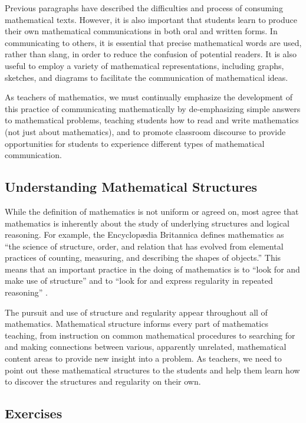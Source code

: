 \documentclass[
]{book}
\theoremstyle{definition}
\theoremstyle{definition}
\theoremstyle{definition}
\theoremstyle{remark}
\begin{document}
Previous paragraphs have described the difficulties and process of consuming mathematical texts. However, it is also important that students learn to produce their own mathematical communications in both oral and written forms. In communicating to others, it is essential that precise mathematical words are used, rather than slang, in order to reduce the confusion of potential readers. It is also useful to employ a variety of mathematical representations, including graphs, sketches, and diagrams to facilitate the communication of mathematical ideas.

As teachers of mathematics, we must continually emphasize the development of this practice of communicating mathematically by de-emphasizing simple answers to mathematical problems, teaching students how to read and write mathematics (not just about mathematics), and to promote classroom discourse to provide opportunities for students to experience different types of mathematical communication.

\hypertarget{understanding-mathematical-structures}{%
\subsection{Understanding Mathematical Structures}\label{understanding-mathematical-structures}}

While the definition of mathematics is not uniform or agreed on, most agree that mathematics is inherently about the study of underlying structures and logical reasoning. For example, the Encyclopædia Britannica \citeyearpar{definition} defines mathematics as ``the science of structure, order, and relation that has evolved from elemental practices of counting, measuring, and describing the shapes of objects.'' This means that an important practice in the doing of mathematics is to ``look for and make use of structure'' and to ``look for and express regularity in repeated reasoning'' \citep{CCSS}.

The pursuit and use of structure and regularity appear throughout all of mathematics. Mathematical structure informs every part of mathematics teaching, from instruction on common mathematical procedures to searching for and making connections between various, apparently unrelated, mathematical content areas to provide new insight into a problem. As teachers, we need to point out these mathematical structures to the students and help them learn how to discover the structures and regularity on their own.

\hypertarget{exercises-1}{%
\subsection{Exercises}\label{exercises-1}}
\end{document}
